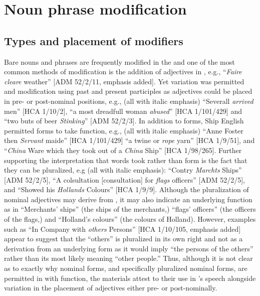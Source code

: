 \section{{Noun phrase modification} }%

\subsection{{Types and placement of modifiers}}%

Bare nouns and  phrases are frequently modified in the  and one of the most common methods of modification is the addition of adjectives in , e.g., “\textit{Faire cleare} weather” [ADM 52/2/11, emphasis added]. Yet variation was permitted and modification using past and present participles as adjectives could be placed in pre- or post-nominal positions, e.g., (all with italic emphasis) “Severall \textit{arrived} men” [HCA 1/10/2], “a most dreadfull woman \textit{abused}” [HCA 1/101/429] and “two buts of beer \textit{Stinking}” [ADM 52/2/3].  In addition to   forms, Ship English permitted  forms to take  function, e.g., (all with italic emphasis) “Anne Foster then \textit{Servant} maide” [HCA 1/101/429] “a twine or \textit{rope} yarn” [HCA 1/9/51], and “\textit{China} Ware which they took out of a \textit{China} Ship” [HCA 1/98/265]. Further supporting the interpretation that  words took  rather than  form is the fact that they can be pluralized, e.g (all with italic emphasis): “Contry \textit{Marchts} Ships” [ADM 52/2/5], “A colsultation [consultation] for \textit{flags} officers” [ADM 52/2/5], and “Showed his \textit{Hollands} Colours” [HCA 1/9/9]. Although the pluralization of nominal adjectives may derive from , it may also indicate an underlying  function as in “Merchants’ ships” (the ships of the merchants,) “flags’ officers” (the officers of the flags,) and “Holland’s colours” (the colours of Holland). However, examples such as “In Company with \textit{others} Persons” [HCA 1/10/105, emphasis added] appear to suggest that the  “others” is pluralized in its own right and not as a derivation from an underlying  form as it would imply “the persons of the others” rather than its most likely meaning “other people.” Thus, although it is not clear as to exactly why nominal forms, and specifically pluralized nominal forms, are permitted in  with  function, the  materials attest to their use in ’s speech alongside variation in the placement of  adjectives either pre- or post-nominally. 

